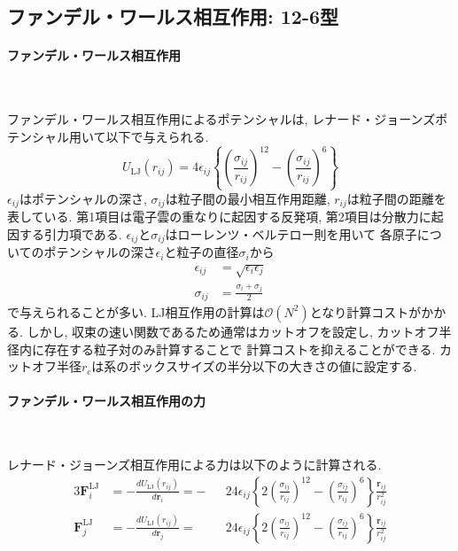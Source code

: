 \clearpage
\subsection{ファンデル・ワールス相互作用: 12-6型}
\paragraph{ファンデル・ワールス相互作用} \

ファンデル・ワールス相互作用によるポテンシャルは, レナード・ジョーンズポテンシャル用いて以下で与えられる. 
\begin{equation}
    U_{\mathrm{LJ}}(r_{ij})
 =
   4\epsilon_{ij}
   \left\{
           \left(\frac{\sigma_{ij}}{r_{ij}}\right)^{12}
          -\left(\frac{\sigma_{ij}}{r_{ij}}\right)^{6}
   \right\}
 \label{eq:BioModel29}
\end{equation}
$\epsilon_{ij}$はポテンシャルの深さ, $\sigma_{ij}$は粒子間の最小相互作用距離, 
$r_{ij}$は粒子間の距離を表している. 
第1項目は電子雲の重なりに起因する反発項, 第2項目は分散力に起因する引力項である. 
$\epsilon_{ij}$と$\sigma_{ij}$はローレンツ・ベルテロー則を用いて
各原子についてのポテンシャルの深さ$\epsilon_{i}$と粒子の直径$\sigma_{i}$から
\begin{align}
 \epsilon_{ij} &= \sqrt{\epsilon_{i} \epsilon_{j}}
 \\
 \sigma  _{ij} &= \frac{\sigma_{i} + \sigma_{j}}{2}
 \label{eq:BioModel30}
\end{align}
で与えられることが多い.
LJ相互作用の計算は$\mathcal{O}(N^2)$となり計算コストがかかる. 
しかし, 収束の速い関数であるため通常はカットオフを設定し, カットオフ半径内に存在する粒子対のみ計算することで
計算コストを抑えることができる. 
カットオフ半径$r_{c}$は系のボックスサイズの半分以下の大きさの値に設定する. 

\paragraph{ファンデル・ワールス相互作用の力} \

レナード・ジョーンズ相互作用による力は以下のように計算される. 
\begin{alignat}{3}
    \bm{F}_{i}^{\mathrm{LJ}}
 &=
   -\frac{d U_{\mathrm{LJ}}(r_{ij})}{d \bm{r}_{i}}
  =
   -&&
   24 \epsilon_{ij}
   \left\{
           2\left( \frac{\sigma_{ij}}{r_{ij}} \right)^{12}
          - \left( \frac{\sigma_{ij}}{r_{ij}} \right)^{6}
   \right\}
   \frac{\bm{r}_{ij}}{r_{ij}^{2}}
 \label{eq:BioModel31}
 \\
    \bm{F}_{j}^{\mathrm{LJ}}
 &=
   -\frac{d U_{\mathrm{LJ}}(r_{ij})}{d \bm{r}_{j}}
 =
   &&
   24 \epsilon_{ij}
   \left\{
           2\left( \frac{\sigma_{ij}}{r_{ij}} \right)^{12}
          - \left( \frac{\sigma_{ij}}{r_{ij}} \right)^{6}
   \right\}
   \frac{\bm{r}_{ij}}{r_{ij}^{2}}
 \label{eq:BioModel32}
\end{alignat}

